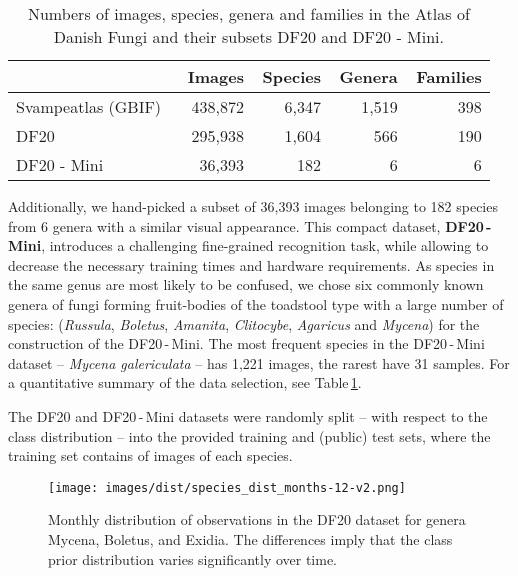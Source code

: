 \documentclass[10pt,twocolumn,letterpaper]{article}
\begin{document}
\begin{table}[t]
\small
\begin{center}
\renewcommand{\arraystretch}{1.1}
\setlength{\tabcolsep}{0.4em}
\begin{tabular}{|l|r|r|r|r|}
\cline{2-5}
\multicolumn{1}{l|}{ } & \multicolumn{1}{c|}{\,\,\,\,Images} & \multicolumn{1}{c|}{\,Species} & \multicolumn{1}{c|}{\,Genera} & \multicolumn{1}{c|}{\,Families} \\
\hline
Svampeatlas (GBIF)& 438,872 & 6,347 & 1,519 & 398 \\
DF20           & 295,938 & 1,604 &   566 & 190 \\
DF20 - Mini    &  36,393 &   182 &     6 &   6 \\
\hline
\end{tabular}
\end{center}
\caption{Numbers of images, species, genera and families in the Atlas of Danish Fungi and their subsets DF20 and DF20 - Mini.}
\label{table:dataset_stats}
\end{table}
Additionally, we hand-picked a subset of 36,393 images belonging to 182 species from 6 genera with a similar visual appearance. This compact dataset, \textbf{DF20\,-\,Mini}, introduces a challenging fine-grained recognition task, while allowing to decrease the necessary training times and hardware requirements.
As species in the same genus are most likely to be confused, we chose six commonly known genera of fungi forming fruit-bodies of the toadstool type with a large number of species: (\textit{Russula}, \textit{Boletus}, \textit{Amanita}, \textit{Clitocybe}, \textit{Agaricus} and \textit{Mycena}) for the construction of the DF20\,-\,Mini. The most frequent species in the DF20\,-\,Mini dataset -- \textit{Mycena galericulata} -- has 1,221 images, the rarest  have 31 samples. For a quantitative summary of the data selection, see Table\,\ref{table:dataset_stats}.

The DF20 and DF20\,-\,Mini datasets were randomly split -- with respect to the class distribution -- into the provided training and (public) test sets, where the training set contains  of images of each species.

\begin{figure*}[t]
\begin{center}
\texttt{[image: images/dist/species\_dist\_months-12-v2.png]}
\caption{Monthly distribution of observations in the DF20 dataset for genera Mycena, Boletus, and Exidia. The differences imply that the class prior distribution varies significantly over time.}
\label{fig:genus_occurence}
\end{center}
\end{figure*}
\end{document}
